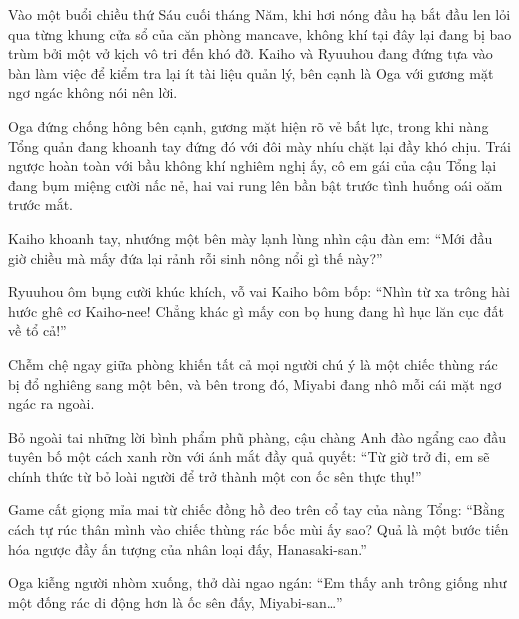\documentclass[../main.tex]{subfiles}
\begin{document}

Vào một buổi chiều thứ Sáu cuối tháng Năm, khi hơi nóng đầu hạ bắt đầu len lỏi qua từng khung cửa sổ của căn phòng mancave, không khí tại đây lại đang bị bao trùm bởi một vở kịch vô tri đến khó đỡ. Kaiho và Ryuuhou đang đứng tựa vào bàn làm việc để kiểm tra lại ít tài liệu quản lý, bên cạnh là Oga với gương mặt ngơ ngác không nói nên lời.

Oga đứng chống hông bên cạnh, gương mặt hiện rõ vẻ bất lực, trong khi nàng Tổng quản đang khoanh tay đứng đó với đôi mày nhíu chặt lại đầy khó chịu. Trái ngược hoàn toàn với bầu không khí nghiêm nghị ấy, cô em gái của cậu Tổng lại đang bụm miệng cười nấc nẻ, hai vai rung lên bần bật trước tình huống oái oăm trước mắt.

Kaiho khoanh tay, nhướng một bên mày lạnh lùng nhìn cậu đàn em: ``Mới đầu giờ chiều mà mấy đứa lại rảnh rỗi sinh nông nổi gì thế này?''

Ryuuhou ôm bụng cười khúc khích, vỗ vai Kaiho bôm bốp: ``Nhìn từ xa trông hài hước ghê cơ Kaiho-nee! Chẳng khác gì mấy con bọ hung đang hì hục lăn cục đất về tổ cả!''

Chễm chệ ngay giữa phòng khiến tất cả mọi người chú ý là một chiếc thùng rác bị đổ nghiêng sang một bên, và bên trong đó, Miyabi đang nhô mỗi cái mặt ngơ ngác ra ngoài.


Bỏ ngoài tai những lời bình phẩm phũ phàng, cậu chàng Anh đào ngẩng cao đầu tuyên bố một cách xanh rờn với ánh mắt đầy quả quyết: ``Từ giờ trở đi, em sẽ chính thức từ bỏ loài người để trở thành một con ốc sên thực thụ!''

Game cất giọng mỉa mai từ chiếc đồng hồ đeo trên cổ tay của nàng Tổng: ``Bằng cách tự rúc thân mình vào chiếc thùng rác bốc mùi ấy sao? Quả là một bước tiến hóa ngược đầy ấn tượng của nhân loại đấy, Hanasaki-san.''

Oga kiễng người nhòm xuống, thở dài ngao ngán: ``Em thấy anh trông giống như một đống rác di động hơn là ốc sên đấy, Miyabi-san\dots''
\end{document}
